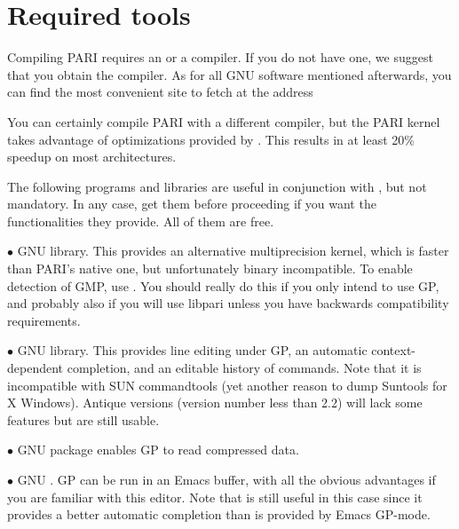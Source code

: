 %
%

\def\tocwrite#1{}
\section{Required tools}

Compiling PARI requires an  or a  compiler. If you do
not have one, we suggest that you obtain the  compiler. As for
all GNU software mentioned afterwards, you can find the most convenient site
to fetch  at the address


\noindent You can certainly compile PARI with a different compiler, but the
PARI kernel takes advantage of optimizations provided by . This
results in at least 20\% speedup on most architectures.

 The following programs and libraries are useful
in conjunction with , but not mandatory. In any case, get them before
proceeding if you want the functionalities they provide. All of them are free.

  $\bullet$ GNU  library. This provides an alternative multiprecision
kernel, which is faster than PARI's native one, but unfortunately binary
incompatible. To enable detection of GMP, use .
You should really do this if you only intend to use GP, and probably also if
you will use libpari unless you have backwards compatibility requirements.

  $\bullet$ GNU  library. This provides line editing under GP,
an automatic context-dependent completion, and an editable history of
commands. Note that it is incompatible with SUN commandtools (yet another
reason to dump Suntools for X Windows). Antique versions (version number less
than 2.2) will lack some features but are still usable.

  $\bullet$ GNU  package enables GP to read compressed
data.

  $\bullet$ GNU . GP can be run in an Emacs buffer, with all the
obvious advantages if you are familiar with this editor. Note that
 is still useful in this case since it provides a better
automatic completion than is provided by Emacs GP-mode.

